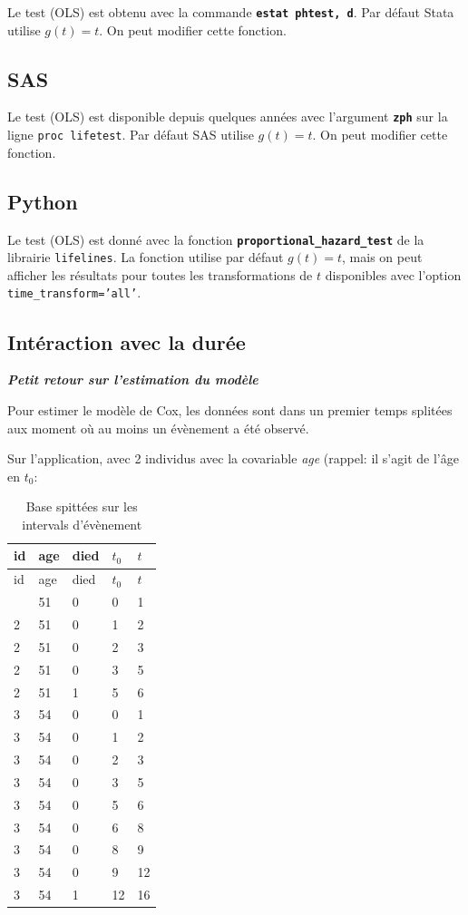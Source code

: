 \documentclass[
  12pt,
  letterpaper,
  DIV=11,
  numbers=noendperiod,
  onepage,
  openany]{scrreprt}
\begin{document}
Le test (OLS) est obtenu avec la commande
\textbf{\texttt{estat\ phtest,\ d}}. Par défaut Stata utilise
\(g(t)=t\). On peut modifier cette fonction.

\subsection{SAS}

Le test (OLS) est disponible depuis quelques années avec l'argument
\textbf{\texttt{zph}} sur la ligne \texttt{proc\ lifetest}. Par défaut
SAS utilise \(g(t)=t\). On peut modifier cette fonction.

\subsection{Python}

Le test (OLS) est donné avec la fonction
\textbf{\texttt{proportional\_hazard\_test}} de la librairie
\texttt{lifelines}. La fonction utilise par défaut \(g(t)=t\), mais on
peut afficher les résultats pour toutes les transformations de \(t\)
disponibles avec l'option \texttt{time\_transform=’all’}.

\hypertarget{intuxe9raction-avec-la-duruxe9e}{%
\subsection{Intéraction avec la
durée}\label{intuxe9raction-avec-la-duruxe9e}}

\textbf{\emph{Petit retour sur l'estimation du modèle}}

Pour estimer le modèle de Cox, les données sont dans un premier temps
splitées aux moment où au moins un évènement a été observé.

Sur l'application, avec 2 individus avec la covariable \emph{age}
(rappel: il s'agit de l'âge en \(t_0\):

\begin{longtable}[]{@{}lllll@{}}
\caption{Base spittées sur les intervals d'évènement}\tabularnewline
\toprule\noalign{}
id & age & died & \(t_0\) & \(t\) \\
\midrule\noalign{}
\endfirsthead
\toprule\noalign{}
id & age & died & \(t_0\) & \(t\) \\
\midrule\noalign{}
\endhead
\bottomrule\noalign{}
\endlastfoot
2 & 51 & 0 & 0 & 1 \\
2 & 51 & 0 & 1 & 2 \\
2 & 51 & 0 & 2 & 3 \\
2 & 51 & 0 & 3 & 5 \\
2 & 51 & 1 & 5 & 6 \\
3 & 54 & 0 & 0 & 1 \\
3 & 54 & 0 & 1 & 2 \\
3 & 54 & 0 & 2 & 3 \\
3 & 54 & 0 & 3 & 5 \\
3 & 54 & 0 & 5 & 6 \\
3 & 54 & 0 & 6 & 8 \\
3 & 54 & 0 & 8 & 9 \\
3 & 54 & 0 & 9 & 12 \\
3 & 54 & 1 & 12 & 16 \\
\end{longtable}
\end{document}
